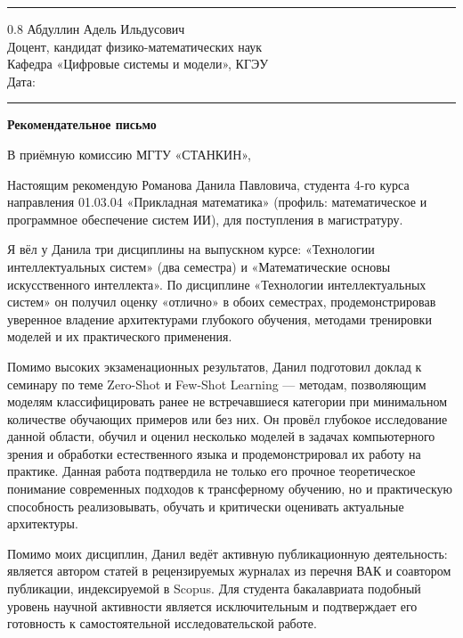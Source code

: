 \documentclass[a4paper,12pt]{article}
\begin{document}
\vspace{4pt}
\noindent\rule{\textwidth}{0.8pt}

\begin{flushright}
  \begin{spacing}{0.8}
    Абдуллин Адель Ильдусович\\
    Доцент, кандидат физико-математических наук\\
    Кафедра «Цифровые системы и модели», КГЭУ\\[6pt]
    Дата: \rule{4cm}{0.4pt}
  \end{spacing}
\end{flushright}

\begin{center}
  {\Large\bfseries Рекомендательное письмо}
\end{center}

В приёмную комиссию МГТУ «СТАНКИН»,

Настоящим рекомендую Романова Данила Павловича, студента 4-го курса направления 01.03.04 «Прикладная математика» (профиль: ма\-те\-ма\-ти\-че\-ское и про\-грамм\-ное обес\-пе\-че\-ние систем ИИ), для по\-сту\-пле\-ния в ма\-ги\-стра\-ту\-ру.

Я вёл у Данила три дисциплины на выпускном курсе: «Технологии интеллектуальных систем» (два семестра) и «Математические основы искусственного интеллекта». По дисциплине «Технологии интеллектуальных систем» он получил оценку «отлично» в обоих семестрах, продемонстрировав уверенное владение архитектурами глубокого обучения, методами тренировки моделей и их практического применения.

Помимо высоких экзаменационных результатов, Данил подготовил доклад к семинару по теме Zero-Shot и Few-Shot Learning --- методам, позволяющим моделям классифицировать ранее не встречавшиеся категории при минимальном количестве обучающих примеров или без них. Он провёл глубокое исследование данной области, обучил и оценил несколько моделей в задачах компьютерного зрения и обработки естественного языка и продемонстрировал их работу на практике. Данная работа подтвердила не только его прочное теоретическое понимание современных подходов к трансферному обучению, но и практическую способность реализовывать, обучать и критически оценивать актуальные архитектуры.

Помимо моих дисциплин, Данил ведёт активную публикационную деятельность: является автором статей в рецензируемых журналах из перечня ВАК и соавтором публикации, индексируемой в Scopus. Для студента бакалавриата подобный уровень научной активности является исключительным и подтверждает его готовность к самостоятельной исследовательской работе.
\end{document}

